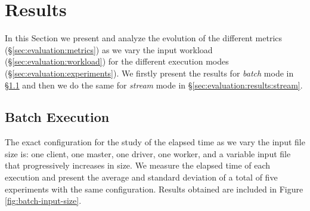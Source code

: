 \section{Results} \label{sec:evaluation:results}

\vspace{-11pt}

In this Section we present and analyze the evolution of the different metrics (\S\ref{sec:evaluation:metrics}) as we vary the input workload (\S\ref{sec:evaluation:workload}) for the different execution modes (\S\ref{sec:evaluation:experiments}).
We firstly present the results for \emph{batch} mode in \S\ref{sec:evaluation:results:batch} and then we do the same for \emph{stream} mode in \S\ref{sec:evaluation:results:stream}.

\vspace{-19pt}

\subsection{Batch Execution} \label{sec:evaluation:results:batch}

\vspace{-8pt}

The exact configuration for the study of the elapsed time as we vary the input file size is: one client, one master, one driver, one worker, and a variable input file that progressively increases in size. 
We measure the elapsed time of each execution and present the average and standard deviation of a total of five experiments with the same configuration.
Results obtained are included in Figure \ref{fig:batch-input-size}.

